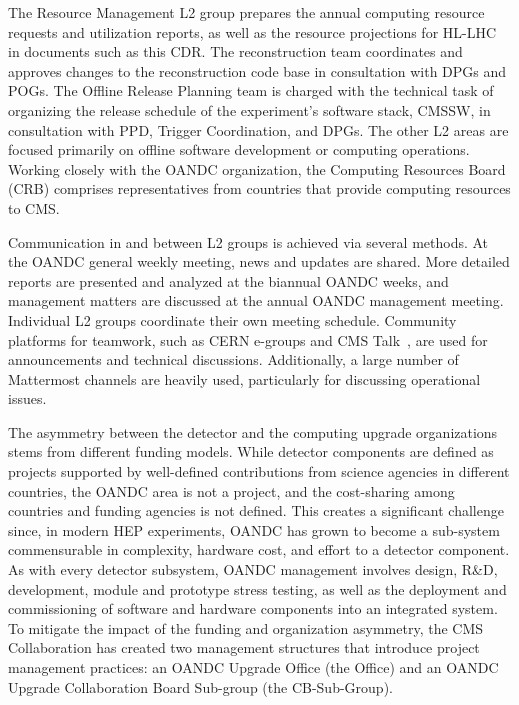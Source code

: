 The Resource Management L2 group prepares the annual computing resource requests and utilization reports, as well as the resource projections for \gls{HL-LHC} in documents such as this \gls{CDR}. The reconstruction team coordinates and approves changes to the reconstruction code base in consultation with \glspl{DPG} and \glspl{POG}. The Offline Release Planning team is charged with the technical task of organizing the release schedule of the experiment's software stack, \gls{CMSSW}, in consultation with \gls{PPD}, Trigger Coordination, and \glspl{DPG}.
The other L2 areas are focused primarily on offline software development or computing operations.
Working closely with the \gls{OANDC} organization, the Computing Resources Board (CRB) comprises representatives from countries that provide computing resources to CMS. 

Communication in and between L2 groups is achieved via several methods. At the \gls{OANDC} general weekly meeting, news and updates are shared. More detailed reports are presented and analyzed at the biannual \gls{OANDC} weeks, and management matters are discussed at the annual \gls{OANDC} management meeting. Individual L2 groups coordinate their own meeting schedule. Community platforms for teamwork, such as CERN e-groups and CMS Talk~\cite{discourse}, are used for announcements and technical discussions. Additionally, a large number of Mattermost channels are heavily used, particularly for discussing operational issues.

The asymmetry between the detector and the computing upgrade organizations stems from different funding models. While detector components are defined as projects supported by well-defined contributions from science agencies in different countries, the \gls{OANDC} area is not a project, and the cost-sharing among countries and funding agencies is not defined. This creates a significant challenge since, in modern \gls{HEP} experiments, \gls{OANDC} has grown to become a sub-system commensurable in complexity, hardware cost, and effort to a detector component. As with every detector subsystem, \gls{OANDC} management involves design, R\&D, development, module and prototype stress testing, as well as the deployment and commissioning of software and hardware components into an integrated system.
To mitigate the impact of the funding and organization asymmetry, the CMS Collaboration has created two management structures that introduce project management practices: an \gls{OANDC} Upgrade Office (the Office) and an \gls{OANDC} Upgrade Collaboration Board Sub-group (the CB-Sub-Group).  

